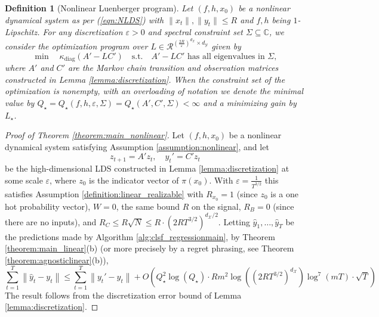 \documentclass[11pt]{article}
\renewcommand{\subset}{\subseteq}
\def\R{{\mathcal R}}
\newcommand{\norm}[1]{\left\lVert#1\right\rVert}
\def\epsilon{\varepsilon}
\def\R{\ensuremath{\mathcal R}}
\newtheorem{definition}[theorem]{Definition}
\numberwithin{equation}{section}
\begin{document}
\begin{definition}[Nonlinear Luenberger program]
\label{def:nonlinearluenbergerprogram}
    Let $(f, h, x_0)$ be a nonlinear dynamical system as per (\ref{eqn:NLDS}) with $\|x_t\|, \|y_t\| \leq R$ and $f, h$ being $1$-Lipschitz. For any discretization $\epsilon > 0$ and spectral constraint set $\Sigma \subset \mathbb{C}$, we consider the optimization program over $L \in \R^{\left(\frac{2R}{\epsilon}\right)^{d_\mathcal{X}} \times d_\mathcal{Y}}$ given by
    $$\min \quad \kappa_{\textrm{diag}}(A'-LC') \quad \text{s.t.} \quad A'-LC' \text{ has all eigenvalues in $\Sigma$},$$
    where $A'$ and $C'$ are the Markov chain transition and observation matrices constructed in Lemma \ref{lemma:discretization}.
    When the constraint set of the optimization is nonempty, with an overloading of notation we denote the minimal value by $Q_\star = Q_\star(f, h, \epsilon, \Sigma) = Q_\star(A', C', \Sigma)  < \infty$ and a minimizing gain by $L_\star$.
\end{definition}

\begin{proof}[Proof of Theorem \ref{theorem:main_nonlinear}]
    
Let $(f, h, x_0)$ be a nonlinear dynamical system satisfying Assumption \ref{assumption:nonlinear}, and let 
    $$z_{t+1} = A'z_t, \quad y_t' = C'z_t$$
    be the high-dimensional LDS constructed in Lemma \ref{lemma:discretization} at some scale $\epsilon$, where $z_0$ is the indicator vector of $\pi(x_0)$. With $\epsilon  = \frac{1}{T^{3/2}}$ this satisfies Assumption \ref{definition:linear_realizable} with $R_{x_0} = 1$ (since $z_0$ is a one hot probability vector), $W = 0$, the same bound $R$ on the signal, $R_B=0$ (since there are no inputs), and $R_C \leq R\sqrt{N} \leq R \cdot \left(2RT^{3/2}\right)^{d_\mathcal{X}/2}$. Letting $\hat{y}_1, \ldots, \hat{y}_T$ be the predictions made by Algorithm \ref{alg:clsf_regressionmain}, by Theorem \ref{theorem:main_linear}(b) (or more precisely by a regret phrasing, see Theorem \ref{theorem:agnosticlinear}(b)),
    $$\sum_{t=1}^T \norm{\hat{y}_t - y_t} \leq \sum_{t=1}^T\norm{y_t' - y_t} + O\left(Q_\star^2 \log(Q_\star) \cdot R m^2 \log\left((2RT^{3/2})^{d_\mathcal{{X}}}\right) \log^7(mT) \cdot \sqrt{T}\right)$$
    The result follows from the discretization error bound of Lemma \ref{lemma:discretization}.
\end{proof}
    

    
    
\end{document}
